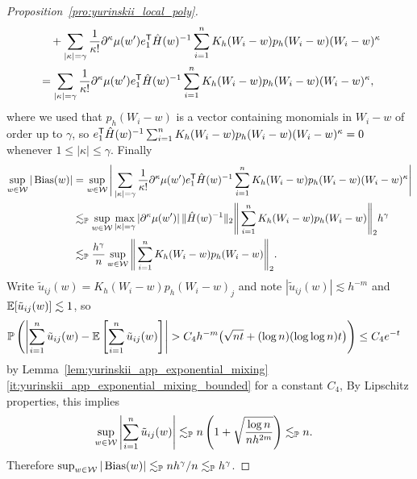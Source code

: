 \begin{proof}[Proposition~\ref{pro:yurinskii_local_poly}]
\begin{align*}
    &\quad+
    \sum_{|\kappa|=\gamma}
    \frac{1}{\kappa!}
    \partial^{\kappa} \mu(w')
    e_1^{\mathsf{T}} \hat H(w)^{-1}
    \sum_{i=1}^n K_h(W_i-w) p_h(W_i-w)
    (W_i-w)^\kappa \\
    &=
    \sum_{|\kappa|=\gamma}
    \frac{1}{\kappa!}
    \partial^{\kappa} \mu(w')
    e_1^{\mathsf{T}} \hat H(w)^{-1}
    \sum_{i=1}^n K_h(W_i-w) p_h(W_i-w)
    (W_i-w)^\kappa,
  \end{align*}
  where we used that
  $p_h(W_i-w)$ is a vector containing monomials
  in $W_i-w$ of order up to $\gamma$, so
  $e_1^{\mathsf{T}} \hat H(w)^{-1}
  \sum_{i=1}^n K_h(W_i-w) p_h(W_i-w)
  (W_i-w)^\kappa = 0$
  whenever $1 \leq |\kappa| \leq \gamma$.
  Finally
  \begin{align*}
    \sup_{w\in\mathcal{W}}
    |\operatorname{Bias}(w)|
    &=
    \sup_{w\in\mathcal{W}}
    \Bigg|
    \sum_{|\kappa|=\gamma}
    \frac{1}{\kappa!}
    \partial^{\kappa} \mu(w')
    e_1^{\mathsf{T}} \hat H(w)^{-1}
    \sum_{i=1}^n K_h(W_i-w) p_h(W_i-w)
    (W_i-w)^\kappa
    \Bigg| \\
    &\lesssim_{\mathbb{P}}
    \sup_{w\in\mathcal{W}}
    \max_{|\kappa| = \gamma}
    \left|
    \partial^{\kappa} \mu(w')
    \right|
    \|\hat H(w)^{-1}\|_2
    \Bigg\|
    \sum_{i=1}^n K_h(W_i-w) p_h(W_i-w)
    \Bigg\|_2
    h^\gamma \\
    &\lesssim_{\mathbb{P}}
    \frac{h^\gamma}{n}
    \sup_{w\in\mathcal{W}}
    \Bigg\|
    \sum_{i=1}^n K_h(W_i-w) p_h(W_i-w)
    \Bigg\|_2.
  \end{align*}
  Write
  $\tilde u_{i j}(w) = K_h(W_i-w)p_h(W_i-w)_j$
  and note $|\tilde u_{i j}(w)| \lesssim h^{-m}$
  and $\mathbb{E}[\tilde u_{i j}(w)] \lesssim 1$, so
  \begin{align*}
    \mathbb{P}\left(
      \left|
      \sum_{i=1}^n \tilde u_{i j}(w)
      - \mathbb{E}\left[
        \sum_{i=1}^n \tilde u_{i j}(w)
      \right]
      \right|
      > C_4 h^{-m} \big( \sqrt{n t}
      + (\log n)(\log \log n) t \big)
    \right)
    &\leq
    C_4 e^{-t}
  \end{align*}
  by Lemma~\ref{lem:yurinskii_app_exponential_mixing}%
  \ref{it:yurinskii_app_exponential_mixing_bounded} for a constant $C_4$,
  By Lipschitz properties, this implies
  \begin{align*}
    \sup_{w \in \mathcal{W}}
    \left|
    \sum_{i=1}^n \tilde u_{i j}(w)
    \right|
    &\lesssim_{\mathbb{P}}
    n
    \left(
      1 + \sqrt{\frac{\log n}{n h^{2m}}}
    \right)
    \lesssim_{\mathbb{P}}
    n.
  \end{align*}
  Therefore
  $\sup_{w\in\mathcal{W}} |\operatorname{Bias}(w)|
  \lesssim_{\mathbb{P}} n h^\gamma / n
  \lesssim_{\mathbb{P}} h^\gamma$.


\end{proof}

